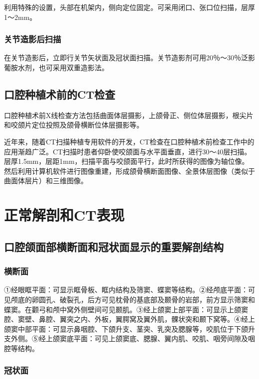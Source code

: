 利用特殊的设置，头部在机架内，侧向定位固定。可采用闭口、张口位扫描，层厚1～2mm。

\subsubsection{关节造影后扫描}

在关节造影后，立即行关节矢状面及冠状面扫描。关节造影剂可用20％～30％泛影葡胺水剂，也可采用双重造影法。

\subsection{口腔种植术前的CT检查}

口腔种植术前X线检查方法包括曲面体层摄影，上颌骨正、侧位体层摄影，根尖片和咬颌片定位投照及颌骨横断位体层摄影等。

近年来，随着CT扫描种植专用软件的开发，CT检查在口腔种植术前检查工作中的应用渐趋广泛。CT扫描时患者仰卧使咬颌面与水平面垂直，进行30～40层扫描。层厚1.5mm，层距1mm，扫描平面与咬颌面平行，此时所获得的图像为轴位像。然后利用计算机软件进行图像重建，形成颌骨横断面图像、全景体层图像（类似于曲面体层片）和三维图像。

\section{正常解剖和CT表现}

\subsection{口腔颌面部横断面和冠状面显示的重要解剖结构}

\subsubsection{横断面}

①经眼眶平面：可显示眶骨板、眶内结构及筛窦、蝶窦等结构。②经颅底平面：可见颅底的卵圆孔、破裂孔，后方可见枕骨的基底部及颞骨的岩部，前方显示筛窦和蝶窦。在颧弓和颅中窝外侧壁间可见颞肌。③经上颌窦上部平面：可显示上颌窦腔、窦壁、鼻腔、翼突之内、外板，翼腭窝及翼外肌，髁状突和颞下窝等。④经上颌窦中部平面：可显示鼻咽腔、下颌升支、茎突、乳突及腮腺等，咬肌位于下颌升支外侧。⑤经上颌窦底平面：可见上颌窦底、腮腺、翼内肌、咬肌、咽旁间隙及咽腔等结构。

\subsubsection{冠状面}

